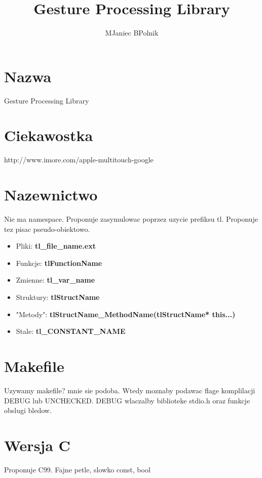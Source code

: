 \documentclass[10pt,a4paper]{article}
\author{MJaniec BPolnik}
\title{Gesture Processing Library}
\begin{document}
\maketitle

\section{Nazwa}
Gesture Processing Library

\section{Ciekawostka}
http://www.imore.com/apple-multitouch-google


\section{Nazewnictwo}
Nie ma namespace. Proponuje zasymulowac poprzez uzycie prefiksu tl.
Proponuje tez pisac pseudo-obiektowo. 
\begin{itemize}
	\item Pliki: \textbf{tl_file_name.ext}
	\item Funkcje: \textbf{tlFunctionName}
	\item Zmienne: \textbf{tl_var_name}
	\item Struktury: \textbf{tlStructName}
	\item "Metody": \textbf{tlStructName_MethodName(tlStructName* this...)}
	\item Stale: \textbf{tl_CONSTANT_NAME} 
\end{itemize}

\section{Makefile}
Uzywamy makefile? mnie sie podoba.
Wtedy moznaby podawac flage komplilacji DEBUG lub UNCHECKED.
DEBUG wlaczalby biblioteke stdio.h oraz funkcje obslugi bledow. 

\section{Wersja C}
Proponuje C99. Fajne petle, slowko const, bool
\end{document}
